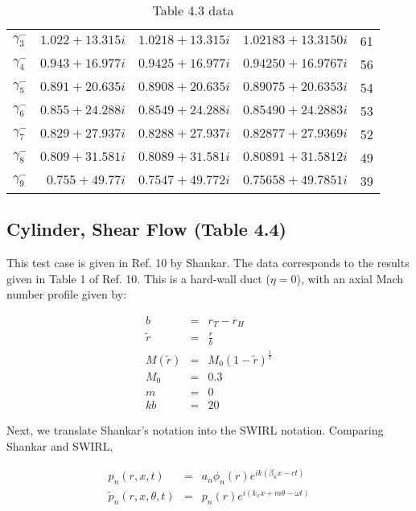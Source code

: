 \documentclass[12pt]{article}
\begin{document}
\begin{table}
\begin{tabular}{c | r | r | r | r}
 $\gamma_3^{-}$ & $ 1.022 + 13.315 i $ & $ 1.0218 + 13.315 i$ & $ 1.02183  + 13.3150 i$ & 61  \\
 $\gamma_4^{-}$ & $ 0.943 + 16.977 i $ & $ 0.9425 + 16.977 i$ & $ 0.94250  + 16.9767 i$ & 56  \\
 $\gamma_5^{-}$ & $ 0.891 + 20.635 i $ & $ 0.8908 + 20.635 i$ & $ 0.89075  + 20.6353 i$ & 54  \\
 $\gamma_6^{-}$ & $ 0.855 + 24.288 i $ & $ 0.8549 + 24.288 i$ & $ 0.85490  + 24.2883 i$ & 53  \\
 $\gamma_7^{-}$ & $ 0.829 + 27.937 i $ & $ 0.8288 + 27.937 i$ & $ 0.82877  + 27.9369 i$ & 52  \\
 $\gamma_8^{-}$ & $ 0.809 + 31.581 i $ & $ 0.8089 + 31.581 i$ & $ 0.80891  + 31.5812 i$ & 49  \\
 $\gamma_9^{-}$ & $ 0.755 + 49.77  i $ & $ 0.7547 + 49.772 i$ & $ 0.75658  + 49.7851 i$ & 39  \\ \hline
 \end{tabular}
 \caption{Table 4.3 data}
 \label{Table43}
\end{table}

\subsection{Cylinder, Shear Flow (Table 4.4)}

This test case is given in Ref. 10 by Shankar.  The data corresponds to the results
given in Table 1 of Ref. 10.  This is a hard-wall duct ($\eta = 0$), with an axial
Mach number profile given by:

\begin{eqnarray}
b &=& r_T - r_H
\nonumber
\\
\widetilde{r} &=& \frac{r}{b}
\nonumber
\\
M \left(\widetilde{r} \right)
&=&
M_0 \left(1 - \widetilde{r} \right)^{\frac{1}{7}}
\nonumber
\\
M_0 &=& 0.3
\nonumber
\\
m &=& 0
\nonumber
\\
kb &=& 20
\nonumber
\end{eqnarray}

Next, we translate Shankar's notation into the SWIRL notation.  Comparing
Shankar and SWIRL,

\begin{eqnarray}
p_n \left(r, x, t \right)
&=&
a_n \phi_n \left( r \right)
e^{i k \left(\beta_n x - c t \right)}
\nonumber
\\
\widetilde{p}_n \left(r, x, \theta, t \right)
&=&
p_n \left(r \right) e^{i \left(k_x x + m \theta - \omega t \right)}
\nonumber
\end{eqnarray}
\end{document}

